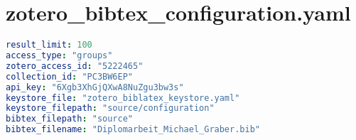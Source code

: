 
\section{zotero\_bibtex\_configuration.yaml}
\lstset{style=gra_codestyle}
\begin{lstlisting}[language=yaml, caption=Python LaTex - zotero\_bibtex\_configuration.yaml - Konfigurationsdatei - Zotero BibLaTex Importer,captionpos=b,label={lst:zotero_bibtex_configuration},breaklines=true]
result_limit: 100
access_type: "groups"
zotero_access_id: "5222465"
collection_id: "PC3BW6EP"
api_key: "6Xgb3XhGjQXwA8NuZgu3bw3s"
keystore_file: "zotero_biblatex_keystore.yaml"
keystore_filepath: "source/configuration"
bibtex_filepath: "source"
bibtex_filename: "Diplomarbeit_Michael_Graber.bib"
\end{lstlisting}
